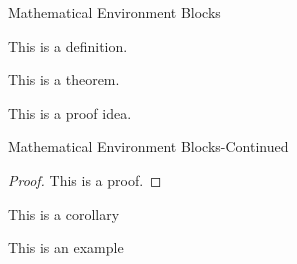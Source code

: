
\begin{frame}{Mathematical Environment Blocks}
    \begin{definition} 
        This is a definition.
    \end{definition}
    
    \begin{theorem} 
        This is a theorem. 
    \end{theorem}
    
    \begin{lemma} 
        This is a proof idea.
    \end{lemma}
\end{frame}

\begin{frame}{Mathematical Environment Blocks-Continued}
    \begin{proof} 
        This is a proof. 
    \end{proof}
    
    \begin{corollary}
        This is a corollary
    \end{corollary}
    
    \begin{example}
        This is an example 
    \end{example}
\end{frame}
